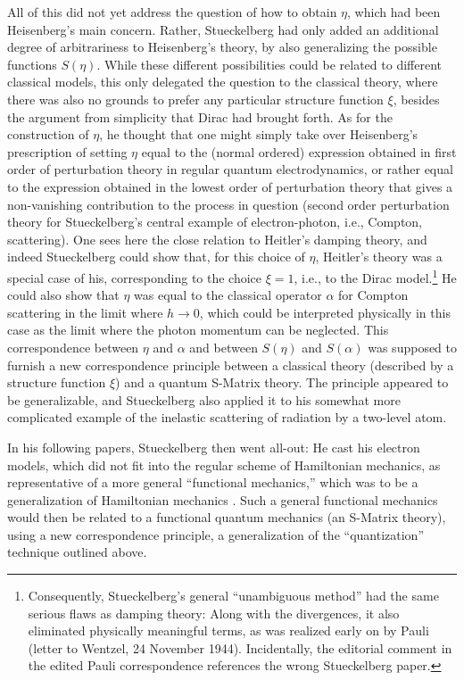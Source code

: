 \documentclass[12pt]{article}
\begin{document}
All of this did not yet address the question of how to obtain $\eta$, which had been Heisenberg's main concern. Rather, Stueckelberg had only added an additional degree of arbitrariness to Heisenberg's theory, by also generalizing the possible functions $S(\eta)$. While these different possibilities could be related to different classical models, this only delegated the question to the classical theory, where there was also no grounds to prefer any particular structure function $\xi$, besides the argument from simplicity that Dirac had brought forth. As for the construction of $\eta$, he thought that one might simply take over Heisenberg's prescription of setting $\eta$ equal to the (normal ordered) expression obtained in first order of perturbation theory in regular quantum electrodynamics, or rather equal to the expression obtained in the lowest order of perturbation theory that gives a non-vanishing contribution to the process in question (second order perturbation theory for Stueckelberg's central example of electron-photon, i.e., Compton, scattering). One sees here the close relation to Heitler's damping theory, and indeed Stueckelberg could show that, for this choice of $\eta$, Heitler's theory was a special case of his, corresponding to the choice $\xi = 1$, i.e., to the Dirac model.\footnote{Consequently, Stueckelberg's general ``unambiguous method'' had the same serious flaws as damping theory: Along with the divergences, it also eliminated physically meaningful terms, as was realized early on by Pauli (letter to Wentzel, 24 November 1944). Incidentally, the editorial comment in the edited Pauli correspondence references the wrong Stueckelberg paper.} He could also show that $\eta$ was equal to the classical operator $\alpha$ for Compton scattering in the limit where $h \rightarrow 0$, which could be interpreted physically in this case as the limit where the photon momentum can be neglected. This correspondence between $\eta$ and $\alpha$ and between $S(\eta)$ and $S(\alpha)$ was supposed to furnish a new correspondence principle between a classical theory (described by a structure function $\xi$) and a quantum S-Matrix theory. The principle appeared to be generalizable, and Stueckelberg also applied it to his somewhat more complicated example of the inelastic scattering of radiation by a two-level atom.

In his following papers, Stueckelberg then went all-out: He cast his electron models, which did not fit into the regular scheme of Hamiltonian mechanics, as representative of a more general ``functional mechanics,'' which was to be a generalization of Hamiltonian mechanics \citep{stueckelberg_1945_mecanique}. Such a general functional mechanics would then be related to a functional quantum mechanics (an S-Matrix theory), using a new correspondence principle, a generalization of the ``quantization'' technique outlined above.
\end{document}
